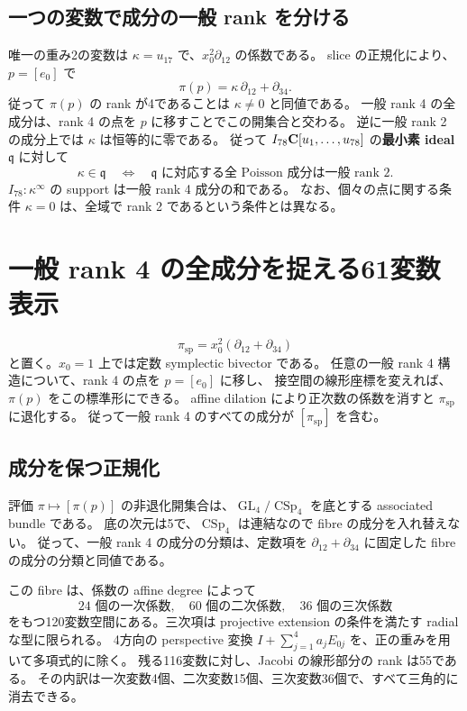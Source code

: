 \documentclass[11pt,a4paper]{ltjsarticle}
\DeclareMathOperator{\GL}{GL}\DeclareMathOperator{\SL}{SL}\DeclareMathOperator{\Sp}{Sp}\DeclareMathOperator{\CSp}{CSp}
\theoremstyle{remark}\newtheorem{remark}[theorem]{注意}\renewcommand{\proofname}{証明}
\begin{document}
\subsection{一つの変数で成分の一般 rank を分ける}
唯一の重み2の変数は $\kappa=u_{17}$ で、$x_0^2\partial_{12}$ の係数である。
slice の正規化により、$p=[e_0]$ で
\[
 \pi(p)=\kappa\,\partial_{12}+\partial_{34}.
\]
従って $\pi(p)$ の rank が4であることは $\kappa\ne0$ と同値である。
一般 rank 4 の全成分は、rank 4 の点を $p$ に移すことでこの開集合と交わる。
逆に一般 rank 2 の成分上では $\kappa$ は恒等的に零である。
従って $I_{78}\mathbf C[u_1,\ldots,u_{78}]$ の\textbf{最小素 ideal} $\mathfrak q$ に対して
\[
 \kappa\in\mathfrak q
 \quad\Longleftrightarrow\quad
 \mathfrak q\text{ に対応する全 Poisson 成分は一般 rank 2}.
\]
$I_{78}:\kappa^\infty$ の support は一般 rank 4 成分の和である。
なお、個々の点に関する条件 $\kappa=0$ は、全域で rank 2 であるという条件とは異なる。

\section{一般 rank 4 の全成分を捉える61変数表示}
\[
 \pi_{\mathrm{sp}}=x_0^2(\partial_{12}+\partial_{34})
\]
と置く。$x_0=1$ 上では定数 symplectic bivector である。
任意の一般 rank 4 構造について、rank 4 の点を $p=[e_0]$ に移し、
接空間の線形座標を変えれば、$\pi(p)$ をこの標準形にできる。
affine dilation により正次数の係数を消すと $\pi_{\mathrm{sp}}$ に退化する。
従って一般 rank 4 のすべての成分が $[\pi_{\mathrm{sp}}]$ を含む。

\subsection{成分を保つ正規化}
評価 $\pi\mapsto[\pi(p)]$ の非退化開集合は、$\GL_4/\CSp_4$ を底とする associated bundle である。
底の次元は5で、$\CSp_4$ は連結なので fibre の成分を入れ替えない。
従って、一般 rank 4 の成分の分類は、定数項を $\partial_{12}+\partial_{34}$ に固定した fibre の成分の分類と同値である。

この fibre は、係数の affine degree によって
\[
24\text{ 個の一次係数},\quad60\text{ 個の二次係数},\quad36\text{ 個の三次係数}
\]
をもつ120変数空間にある。三次項は projective extension の条件を満たす radial な型に限られる。
4方向の perspective 変換 $I+\sum_{j=1}^4a_jE_{0j}$ を、正の重みを用いて多項式的に除く。
残る116変数に対し、Jacobi の線形部分の rank は55である。
その内訳は一次変数4個、二次変数15個、三次変数36個で、すべて三角的に消去できる。
\end{document}
